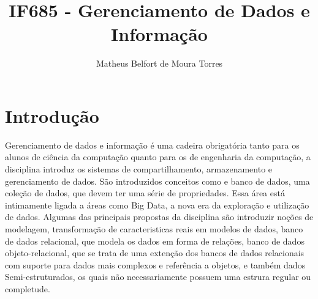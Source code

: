 \documentclass[a4paper]{article}
\title{IF685 - Gerenciamento de Dados e Informação}
\author{Matheus Belfort de Moura Torres}
\begin{document}
\maketitle

\section{Introdução}

 Gerenciamento de dados e informação é uma cadeira obrigatória tanto para os alunos de ciência da computação\cite{CinSecGrad-cc} quanto para os de engenharia da computação\cite{CinSecGrad-ec}, a disciplina introduz os sistemas de compartilhamento, armazenamento e gerenciamento de dados. São introduzidos conceitos como e banco de dados, uma coleção de dados, que devem ter uma série de propriedades\cite{elmasri2011sistemas}. Essa área está intimamente ligada a áreas como Big Data, a nova era da exploração e utilização de dados\cite{IBM:2011:UBD:2132803}. Algumas das principais propostas da disciplina são introduzir noções de modelagem, transformação de caracteristicas reais em modelos de dados\cite{IF685:2017.1}, banco de dados relacional, que modela os dados em forma de relações\cite{IF685:2017.1}, banco de dados objeto-relacional, que se trata de uma extenção dos bancos de dados relacionais com suporte para dados mais complexos e referência a objetos\cite{IF685:2017.1}, e também dados Semi-estruturados, os quais não necessariamente possuem uma estrura regular ou completude\cite{IF685:2017.1}.
\end{document}
